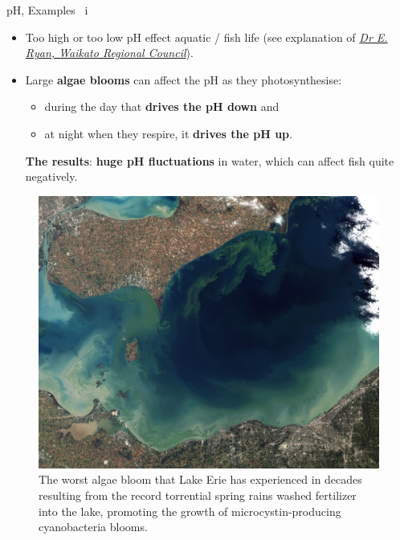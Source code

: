 \begin{frame}{pH, Examples \, i}
	
	\lcol
	\vskip -5pt
	\begin{itemize}
		\item Too high or too low pH effect aquatic / fish life (see explanation of \href{https://www.sciencelearn.org.nz/videos/1961-ph}{\textcolor{indigo(dye)}{\it Dr E. Ryan, Waikato Regional Council}}). 
		\pause
		\item 
	Large \alert{\textbf{algae blooms}} can affect the pH as they photosynthesise: 
	\begin{itemize}
		\item during the day that \textbf{drives the pH down} and 
		\item at night when they respire, it \textbf{drives the pH up}.
	\end{itemize}
	\alert{\textbf{The results}}: \textbf{huge pH fluctuations} in water, which can affect fish quite negatively. 
	\end{itemize}
	\rcol
	\begin{figure}
		\centering
		\includegraphics[width=0.85\columnwidth]{figures/chemical-equilibrium/toxic_algae_bloom_lake_erie.jpg}
		\caption{\small The worst algae bloom that Lake Erie has experienced in decades resulting from the record torrential spring rains washed fertilizer into the lake, promoting the growth of microcystin-producing cyanobacteria blooms.}
	\end{figure}

	\ecol
	
\end{frame}
%
